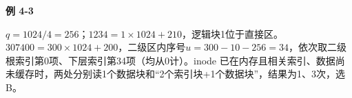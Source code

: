 {\color{ink}\bfseries 例 4-3}\par\vspace{1bp}\(q=\allowbreak{}1024/\allowbreak{}4=\allowbreak{}256\)；\(1234=\allowbreak{}1\times 1024+\allowbreak{}210\)，逻辑块1位于直接区。\(307400=\allowbreak{}300\times 1024+\allowbreak{}200\)，二级区内序号\(u=\allowbreak{}300-10-256=\allowbreak{}34\)，依次取二级根索引第0项、下层索引第34项（均从0计）。inode 已在内存且相关索引、数据尚未缓存时，两处分别读1个数据块和“2个索引块+\allowbreak{}1个数据块”，结果为1、3次，选B。
